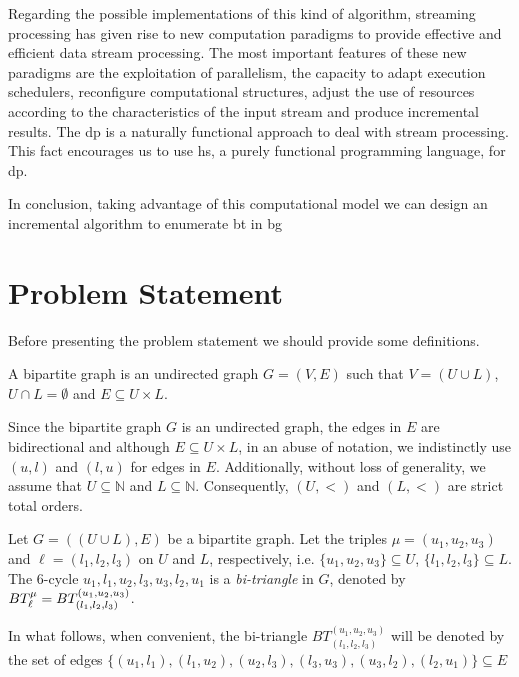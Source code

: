 Regarding the possible implementations of this kind of algorithm, streaming processing has given rise to new computation paradigms to provide effective and efficient data stream processing.
The most important features of these new paradigms are the exploitation of parallelism, the capacity to adapt execution schedulers, 
reconfigure computational structures, adjust the use of resources according to the characteristics of the input stream and produce incremental results. 
The \acrfull{dp} is a naturally functional approach to deal with stream processing. 
This fact encourages us to use \acrlong{hs}, a purely functional programming language, for \acrshort{dp}.

In conclusion, taking advantage of this computational model we can design an incremental algorithm to enumerate \acrshort{bt} in \acrshort{bg}

\section{Problem Statement}
Before presenting the problem statement we should provide some definitions.

\begin{definition}[\acrlong{bg}] 
A bipartite graph is an undirected graph $G=(V,E)$  such that $V=(U\cup L)$, $U\cap L=\emptyset$ and $E\subseteq U\times L$.\cite{Bondy1976}
\end{definition}

Since the bipartite graph $G$ is an undirected graph, the edges in $E$ are bidirectional and although $E\subseteq U\times L$, in an abuse of notation, we indistinctly use $(u,l)$ and $(l,u)$ for edges in $E$. Additionally, 
without loss of generality, we assume that  $U\subseteq \mathbb{N}$ and $L\subseteq \mathbb{N}$. Consequently, $(U,<)$  and $(L,<)$ are strict total orders. 

%
\begin{definition}[\acrlong{bt}]
Let $G=((U\cup L),E)$ be a bipartite graph. Let the triples $\mu=(u_1, u_2, u_3)$ and $\ell=(l_1, l_2,l_3)$ on $U$ and $L$, respectively, i.e.  $\{u_1, u_2, u_3\} \subseteq U$, $\{l_1, l_2,l_3\} \subseteq L$. 
The 6-cycle $u_1,l_1,u_2,l_3,u_3,l_2,u_1$  is a \textit{bi-triangle} in $G$, denoted by $BT_{\ell}^{\mu} = BT_{(l_1, l_2,l_3)}^{(u_1, u_2, u_3)}$. 
\end{definition}

In what follows, when convenient, the bi-triangle $BT_{(l_1,l_2,l_3)}^{(u_1,u_2,u_3)}$  will be denoted by the set of edges $\{(u_1, l_1), (l_1,u_2), (u_2, l_3), (l_3,u_3), (u_3, l_2), (l_2,u_1)\} \subseteq E$

